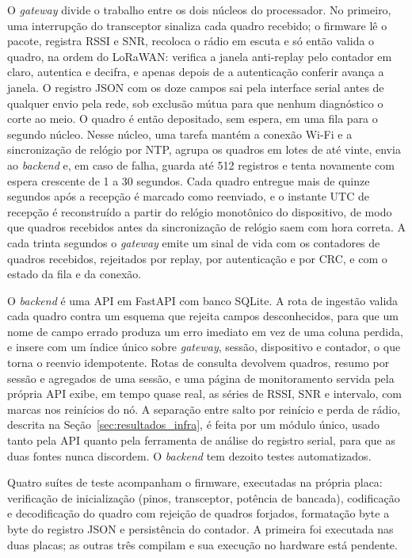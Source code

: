 O \textit{gateway} divide o trabalho entre os dois núcleos do processador. No primeiro, uma interrupção do transceptor sinaliza cada quadro recebido; o firmware lê o pacote, registra RSSI e SNR, recoloca o rádio em escuta e só então valida o quadro, na ordem do LoRaWAN: verifica a janela anti-replay pelo contador em claro, autentica e decifra, e apenas depois de a autenticação conferir avança a janela. O registro JSON com os doze campos sai pela interface serial antes de qualquer envio pela rede, sob exclusão mútua para que nenhum diagnóstico o corte ao meio. O quadro é então depositado, sem espera, em uma fila para o segundo núcleo. Nesse núcleo, uma tarefa mantém a conexão Wi-Fi e a sincronização de relógio por NTP, agrupa os quadros em lotes de até vinte, envia ao \textit{backend} e, em caso de falha, guarda até 512 registros e tenta novamente com espera crescente de 1 a 30 segundos. Cada quadro entregue mais de quinze segundos após a recepção é marcado como reenviado, e o instante UTC de recepção é reconstruído a partir do relógio monotônico do dispositivo, de modo que quadros recebidos antes da sincronização de relógio saem com hora correta. A cada trinta segundos o \textit{gateway} emite um sinal de vida com os contadores de quadros recebidos, rejeitados por replay, por autenticação e por CRC, e com o estado da fila e da conexão.

O \textit{backend} é uma API em FastAPI com banco SQLite. A rota de ingestão valida cada quadro contra um esquema que rejeita campos desconhecidos, para que um nome de campo errado produza um erro imediato em vez de uma coluna perdida, e insere com um índice único sobre \textit{gateway}, sessão, dispositivo e contador, o que torna o reenvio idempotente. Rotas de consulta devolvem quadros, resumo por sessão e agregados de uma sessão, e uma página de monitoramento servida pela própria API exibe, em tempo quase real, as séries de RSSI, SNR e intervalo, com marcas nos reinícios do nó. A separação entre salto por reinício e perda de rádio, descrita na Seção~\ref{sec:resultados_infra}, é feita por um módulo único, usado tanto pela API quanto pela ferramenta de análise do registro serial, para que as duas fontes nunca discordem. O \textit{backend} tem dezoito testes automatizados.

Quatro suítes de teste acompanham o firmware, executadas na própria placa: verificação de inicialização (pinos, transceptor, potência de bancada), codificação e decodificação do quadro com rejeição de quadros forjados, formatação byte a byte do registro JSON e persistência do contador. A primeira foi executada nas duas placas; as outras três compilam e sua execução no hardware está pendente.



